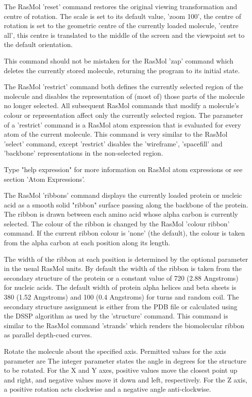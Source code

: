 The RasMol
'reset'
command restores the original viewing transformation
and centre of rotation. The scale is set to its default value,
'zoom 100',
the centre of rotation is set to the geometric centre of the currently
loaded molecule,
'centre all',
this centre is translated to the middle of the screen and
the viewpoint set to the default orientation.

This command should not be mistaken for the RasMol
'zap'
command which deletes the currently stored molecule, returning the
program to its initial state.

The RasMol
'restrict'
command both defines the currently selected region of the
molecule and disables the representation of (most of) those parts of the
molecule no longer selected.  All subsequent RasMol commands that modify
a molecule's colour or representation affect only the currently selected
region. The parameter of a
'restrict'
command is a RasMol atom expression that is evaluated for every atom
of the current molecule. This command is very similar to the RasMol
'select'
command, except
'restrict'
disables the
'wireframe',
'spacefill'
and
'backbone'
representations in the non-selected region.

Type "help expression" for more information on RasMol atom expressions or
see section
'Atom Expressions'.

The RasMol
'ribbons'
command displays the currently loaded protein or nucleic acid as a
smooth solid "ribbon" surface passing along the backbone of the protein.
The ribbon is drawn between each amino acid whose alpha carbon is
currently selected. The colour of the ribbon is changed by the RasMol
'colour ribbon'
command. If the current ribbon colour is
'none'
(the default), the colour is taken from the alpha carbon at each
position along its length.

The width of the ribbon at each position is determined by the optional
parameter in the usual RasMol units. By default the width of the ribbon
is taken from the secondary structure of the protein or a constant value
of 720 (2.88 Angstroms) for nucleic acids.
The default width of protein alpha helices and beta sheets is 380 (1.52
Angstroms) and 100 (0.4 Angstroms) for turns and random coil. The
secondary structure assignment is either from the PDB file or calculated
using the DSSP algorithm as used by the
'structure'
command. This command is similar to the RasMol command
'strands'
which renders the biomolecular ribbon as parallel depth-cued curves.

Rotate the molecule about the specified axis.
Permitted values for the axis parameter are
The integer parameter states the angle in degrees for the structure to
be rotated. For the X and Y axes, positive values move the closest point
up and right, and negative values move it down and left, respectively. For
the Z axis, a positive rotation acts clockwise and a negative angle
anti-clockwise.


